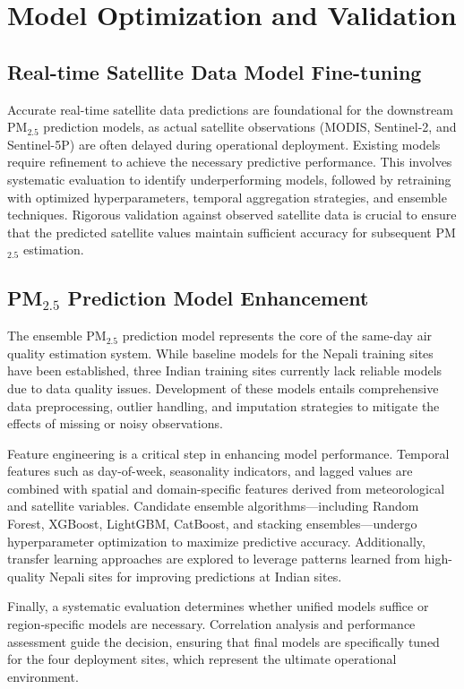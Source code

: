 \documentclass[12pt]{report}
\begin{document}
\section{Model Optimization and Validation}

\subsection{Real-time Satellite Data Model Fine-tuning}

Accurate real-time satellite data predictions are foundational for the downstream PM$_{2.5}$ prediction models, as actual satellite observations (MODIS, Sentinel-2, and Sentinel-5P) are often delayed during operational deployment. Existing models require refinement to achieve the necessary predictive performance. This involves systematic evaluation to identify underperforming models, followed by retraining with optimized hyperparameters, temporal aggregation strategies, and ensemble techniques. Rigorous validation against observed satellite data is crucial to ensure that the predicted satellite values maintain sufficient accuracy for subsequent PM$_{2.5}$ estimation.

\subsection{PM$_{2.5}$ Prediction Model Enhancement}

The ensemble PM$_{2.5}$ prediction model represents the core of the same-day air quality estimation system. While baseline models for the Nepali training sites have been established, three Indian training sites currently lack reliable models due to data quality issues. Development of these models entails comprehensive data preprocessing, outlier handling, and imputation strategies to mitigate the effects of missing or noisy observations.  

Feature engineering is a critical step in enhancing model performance. Temporal features such as day-of-week, seasonality indicators, and lagged values are combined with spatial and domain-specific features derived from meteorological and satellite variables. Candidate ensemble algorithms—including Random Forest, XGBoost, LightGBM, CatBoost, and stacking ensembles—undergo hyperparameter optimization to maximize predictive accuracy. Additionally, transfer learning approaches are explored to leverage patterns learned from high-quality Nepali sites for improving predictions at Indian sites.  

Finally, a systematic evaluation determines whether unified models suffice or region-specific models are necessary. Correlation analysis and performance assessment guide the decision, ensuring that final models are specifically tuned for the four deployment sites, which represent the ultimate operational environment.
\end{document}
